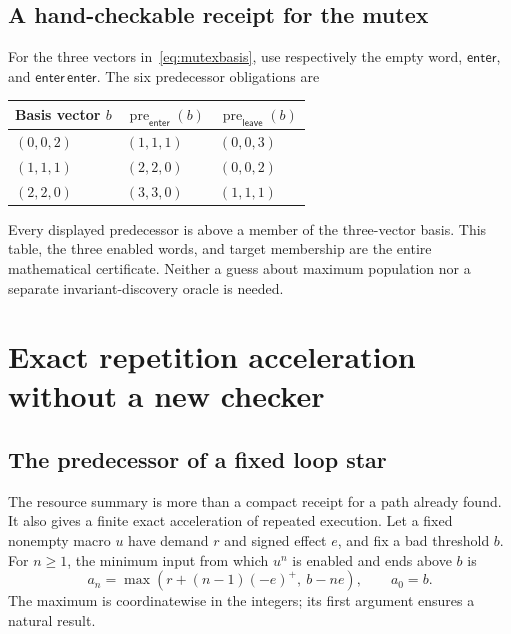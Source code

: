 \documentclass[11pt,a4paper]{article}
\newcommand{\pre}{\operatorname{pre}}
\theoremstyle{definition}
\theoremstyle{remark}
\begin{document}
\subsection{A hand-checkable receipt for the mutex}
For the three vectors in~\eqref{eq:mutexbasis}, use respectively the empty word, $\mathsf{enter}$, and $\mathsf{enter}\,\mathsf{enter}$. The six predecessor obligations are
\begin{center}
\begin{tabular}{@{}lll@{}}
\toprule
Basis vector $b$ & $\pre_{\mathsf{enter}}(b)$ & $\pre_{\mathsf{leave}}(b)$\\
\midrule
$(0,0,2)$ & $(1,1,1)$ & $(0,0,3)$\\
$(1,1,1)$ & $(2,2,0)$ & $(0,0,2)$\\
$(2,2,0)$ & $(3,3,0)$ & $(1,1,1)$\\
\bottomrule
\end{tabular}
\end{center}
Every displayed predecessor is above a member of the three-vector basis. This table, the three enabled words, and target membership are the entire mathematical certificate. Neither a guess about maximum population nor a separate invariant-discovery oracle is needed.


\section{Exact repetition acceleration without a new checker}\label{sec:acceleration}
\subsection{The predecessor of a fixed loop star}
The resource summary is more than a compact receipt for a path already found. It also gives a finite exact acceleration of repeated execution. Let a fixed nonempty macro $u$ have demand $r$ and signed effect $e$, and fix a bad threshold $b$. For $n\ge1$, the minimum input from which $u^n$ is enabled and ends above $b$ is
\begin{equation}\label{eq:starpre}
 a_n=\max\left(r+(n-1)(-e)^+,\ b-ne\right),
 \qquad a_0=b.
\end{equation}
The maximum is coordinatewise in the integers; its first argument ensures a natural result.
\end{document}
